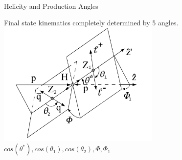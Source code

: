 \begin{frame}{Helicity and Production Angles}
\begin{center}
Final state kinematics completely determined by 5 angles.
\includegraphics[width=0.6\textwidth]{images/plots/angles-HZZ2l2q}
\\
$ cos(\theta^*), cos(\theta_1), cos(\theta_2), \Phi, \Phi_1$
\end{center}
\end{frame}


